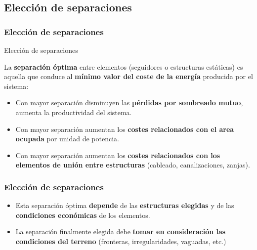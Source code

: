 \documentclass[serif, xcolor=dvipsnames]{beamer}
\begin{document}
\subsection{Elección de separaciones}


\begin{frame}
\frametitle{Elección de separaciones}
\begin{block}
{Elección de separaciones}

La \textbf{separación óptima} entre elementos (seguidores o estructuras
estáticas) es aquella que conduce al \textbf{mínimo valor del coste
de la energía} producida por el sistema:
\begin{itemize}
\item Con mayor separación disminuyen las \textbf{pérdidas por sombreado
mutuo}, aumenta la productividad del sistema.
\item Con mayor separación aumentan los \textbf{costes relacionados con
el area ocupada} por unidad de potencia.
\item Con mayor separación aumentan los \textbf{costes relacionados con
los elementos de unión entre estructuras} (cableado, canalizaciones,
zanjas).
\end{itemize}
\end{block}

\end{frame}

\begin{frame}
\frametitle{Elección de separaciones}
\begin{block}
{}
\begin{itemize}
\item Esta separación óptima \textbf{depende} de las \textbf{estructuras
elegidas} y de las \textbf{condiciones económicas} de los elementos. 
\item La separación finalmente elegida debe \textbf{tomar en consideración
las condiciones del terreno} (fronteras, irregularidades, vaguadas,
etc.)
\end{itemize}
\end{block}

\end{frame}
\end{document}
